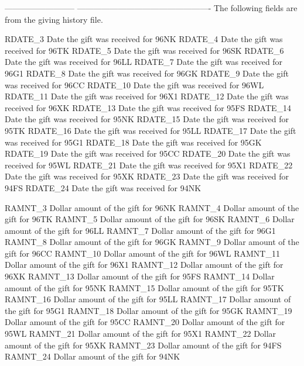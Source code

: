 \documentclass[
  11pt,
  a4paper,
  DIV=12,captions=tableheading,oneside,titlepage]{scrbook}
\let\oldverbatim\verbatim
\let\endoldverbatim\endverbatim
\renewenvironment{verbatim}{\footnotesize\oldverbatim}{\endoldverbatim}
\begin{document}
\begin{verbatim}
--------------------------  -------------------------------------------------
                            The following fields are from the giving history 
                            file.

RDATE_3                     Date the gift was received for 96NK        
RDATE_4                     Date the gift was received for 96TK  
RDATE_5                     Date the gift was received for 96SK  
RDATE_6                     Date the gift was received for 96LL 
RDATE_7                     Date the gift was received for 96G1
RDATE_8                     Date the gift was received for 96GK
RDATE_9                     Date the gift was received for 96CC
RDATE_10                    Date the gift was received for 96WL
RDATE_11                    Date the gift was received for 96X1
RDATE_12                    Date the gift was received for 96XK
RDATE_13                    Date the gift was received for 95FS
RDATE_14                    Date the gift was received for 95NK
RDATE_15                    Date the gift was received for 95TK
RDATE_16                    Date the gift was received for 95LL
RDATE_17                    Date the gift was received for 95G1
RDATE_18                    Date the gift was received for 95GK
RDATE_19                    Date the gift was received for 95CC
RDATE_20                    Date the gift was received for 95WL
RDATE_21                    Date the gift was received for 95X1
RDATE_22                    Date the gift was received for 95XK
RDATE_23                    Date the gift was received for 94FS
RDATE_24                    Date the gift was received for 94NK
        
RAMNT_3                     Dollar amount of the gift for 96NK 
RAMNT_4                     Dollar amount of the gift for 96TK  
RAMNT_5                     Dollar amount of the gift for 96SK  
RAMNT_6                     Dollar amount of the gift for 96LL 
RAMNT_7                     Dollar amount of the gift for 96G1 
RAMNT_8                     Dollar amount of the gift for 96GK  
RAMNT_9                     Dollar amount of the gift for 96CC 
RAMNT_10                    Dollar amount of the gift for 96WL 
RAMNT_11                    Dollar amount of the gift for 96X1 
RAMNT_12                    Dollar amount of the gift for 96XK 
RAMNT_13                    Dollar amount of the gift for 95FS 
RAMNT_14                    Dollar amount of the gift for 95NK 
RAMNT_15                    Dollar amount of the gift for 95TK 
RAMNT_16                    Dollar amount of the gift for 95LL 
RAMNT_17                    Dollar amount of the gift for 95G1 
RAMNT_18                    Dollar amount of the gift for 95GK 
RAMNT_19                    Dollar amount of the gift for 95CC 
RAMNT_20                    Dollar amount of the gift for 95WL 
RAMNT_21                    Dollar amount of the gift for 95X1 
RAMNT_22                    Dollar amount of the gift for 95XK 
RAMNT_23                    Dollar amount of the gift for 94FS 
RAMNT_24                    Dollar amount of the gift for 94NK 


\end{verbatim}
\end{document}
